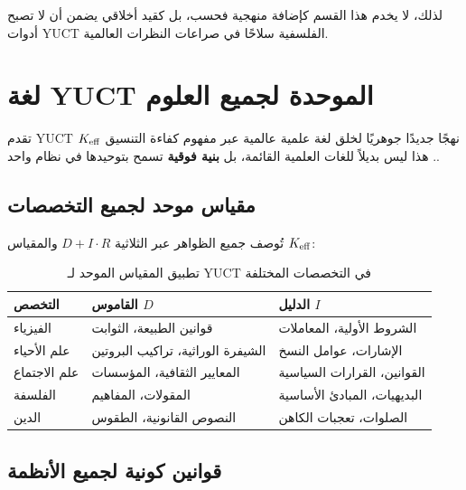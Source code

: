 \documentclass[11pt,a4paper]{article}
\begin{document}
	لذلك، لا يخدم هذا القسم كإضافة منهجية فحسب، بل كقيد أخلاقي يضمن أن لا تصبح أدوات YUCT الفلسفية سلاحًا في صراعات النظرات العالمية.
	
	
	\section{لغة YUCT الموحدة لجميع العلوم}
	
	تقدم YUCT نهجًا جديدًا جوهريًا لخلق لغة علمية عالمية عبر مفهوم كفاءة التنسيق \(\Keff\). هذا ليس بديلاً للغات العلمية القائمة، بل \textbf{بنية فوقية} تسمح بتوحيدها في نظام واحد.
	
	\subsection{مقياس موحد لجميع التخصصات}
	
	تُوصف جميع الظواهر عبر الثلاثية \(D + I \cdot R\) والمقياس \(\Keff\):
	
	\begin{table}[H]
		\centering
		\caption{تطبيق المقياس الموحد لـ YUCT في التخصصات المختلفة}
		\label{tab:unified-metrics}
		\begin{tabular}{p{3.5cm}p{4.5cm}p{4.5cm}}
			\toprule
			\textbf{التخصص} & \textbf{القاموس \(D\)} & \textbf{الدليل \(I\)} \\
			\midrule
			الفيزياء & قوانين الطبيعة، الثوابت & الشروط الأولية، المعاملات \\
			علم الأحياء & الشيفرة الوراثية، تراكيب البروتين & الإشارات، عوامل النسخ \\
			علم الاجتماع & المعايير الثقافية، المؤسسات & القوانين، القرارات السياسية \\
			الفلسفة & المقولات، المفاهيم & البديهيات، المبادئ الأساسية \\
			الدين & النصوص القانونية، الطقوس & الصلوات، تعجبات الكاهن \\
			\bottomrule
		\end{tabular}
	\end{table}
	
	\subsection{قوانين كونية لجميع الأنظمة}
	
\end{document}
